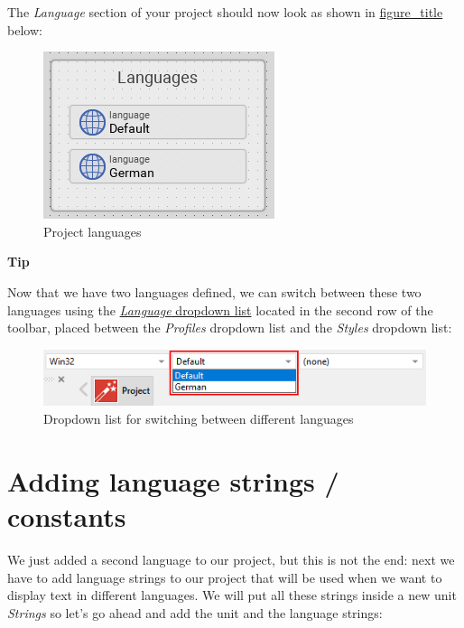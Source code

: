 \documentclass[
  a4paper,
,tablecaptionabove
]{scrbook}
\renewenvironment{quote}{\begin{customblockquote}\list{}{\rightmargin=0em\leftmargin=0em}%
\item\relax\color{blockquote-text}\ignorespaces}{\unskip\unskip\endlist\end{customblockquote}}
\begin{document}
The \emph{Language} section of your project should now look as shown in
\protect\hyperlink{fig:ProjectLanguages}{figure\_title} below:

\begin{figure}
\centering
\includegraphics{./../asciidoc/modules/ROOT/assets/images/localization/ProjectLanguages.png}
\caption{Project languages}
\end{figure}

\begin{quote}
\textbf{Tip}

Now that we have two languages defined, we can switch between these two
languages using the
\href{https://doc.embedded-wizard.de/menu-build\#10}{\emph{Language}
dropdown list} located in the second row of the toolbar, placed between
the \emph{Profiles} dropdown list and the \emph{Styles} dropdown list:

\begin{figure}
\centering
\includegraphics{./../asciidoc/modules/ROOT/assets/images/localization/DropdownLanguages.png}
\caption{Dropdown list for switching between different languages}
\end{figure}
\end{quote}

\hypertarget{_adding_language_strings_constants}{%
\section{Adding language strings /
constants}\label{_adding_language_strings_constants}}

We just added a second language to our project, but this is not the end:
next we have to add language strings to our project that will be used
when we want to display text in different languages. We will put all
these strings inside a new unit \emph{Strings} so let's go ahead and add
the unit and the language strings:
\end{document}
